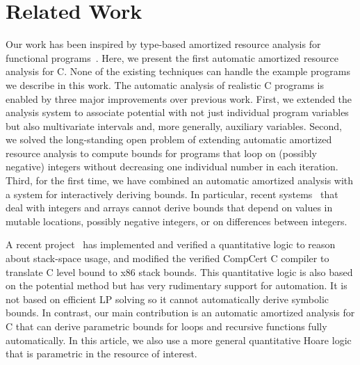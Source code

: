 \documentclass[nocopyrightspace,preprint,pldi]{sigplanconf-pldi15}
\newcommand{\ifshort}[2]{\ifx\fullversion\undefined{#1}\else{#2}\fi}
\newcommand{\sectskip}[0]{\ifshort{\vspace{-3pt}}{}}
\newcommand{\aftersectskip}[0]{\ifshort{\vspace{-1pt}}{}}
\begin{document}
\sectskip
\section{Related Work}
\label{sec:related}
\aftersectskip

Our work has been inspired by type-based amortized resource analysis
for functional programs~\cite{Jost03,HoffmannH10,HoffmannAH12}.  Here,
we present the first automatic amortized resource analysis for
C. None of the existing techniques can handle the example programs we
describe in this work.
%
The automatic analysis of realistic C programs is enabled by three
major improvements over previous work.  First, we extended the
analysis system to associate potential with not just individual
program variables but also multivariate intervals
and, more generally, auxiliary variables.  Second, we solved the
long-standing open problem of extending automatic amortized resource
analysis to compute bounds for programs that loop on (possibly
negative) integers without decreasing one individual number in each
iteration.  Third, for the first time, we have combined an automatic
amortized analysis with a system for interactively deriving bounds. In
particular, recent systems~\cite{HoffmannS13} that deal with integers
and arrays cannot derive bounds that depend on values in mutable
locations, possibly negative integers, or on differences between
integers.

A recent project~\cite{veristack14} has implemented and verified a
quantitative logic to reason about stack-space usage, and modified the
verified CompCert C compiler to translate C level bound to x86 stack
bounds.  This quantitative logic is also based on the potential method
but has very rudimentary support for automation. It is not based on
efficient LP solving so it cannot automatically derive symbolic
bounds.  In contrast, our main contribution is an automatic amortized
analysis for C that can derive parametric bounds for loops and
recursive functions fully automatically.
%
In this article, we also use a more general quantitative Hoare
logic that is parametric in the resource of interest.
\end{document}
